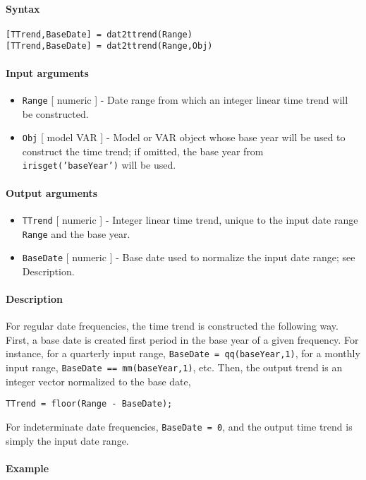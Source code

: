 


	\paragraph{Syntax}

\begin{verbatim}
[TTrend,BaseDate] = dat2ttrend(Range)
[TTrend,BaseDate] = dat2ttrend(Range,Obj)
\end{verbatim}

\paragraph{Input arguments}

\begin{itemize}
\item
  \texttt{Range} {[} numeric {]} - Date range from which an integer
  linear time trend will be constructed.
\item
  \texttt{Obj} {[} model \textbar{} VAR {]} - Model or VAR object whose
  base year will be used to construct the time trend; if omitted, the
  base year from \texttt{irisget('baseYear')} will be used.
\end{itemize}

\paragraph{Output arguments}

\begin{itemize}
\item
  \texttt{TTrend} {[} numeric {]} - Integer linear time trend, unique to
  the input date range \texttt{Range} and the base year.
\item
  \texttt{BaseDate} {[} numeric {]} - Base date used to normalize the
  input date range; see Description.
\end{itemize}

\paragraph{Description}

For regular date frequencies, the time trend is constructed the
following way. First, a base date is created first period in the base
year of a given frequency. For instance, for a quarterly input range,
\texttt{BaseDate = qq(baseYear,1)}, for a monthly input range,
\texttt{BaseDate == mm(baseYear,1)}, etc. Then, the output trend is an
integer vector normalized to the base date,

\begin{verbatim}
TTrend = floor(Range - BaseDate);
\end{verbatim}

For indeterminate date frequencies, \texttt{BaseDate = 0}, and the
output time trend is simply the input date range.

\paragraph{Example}


